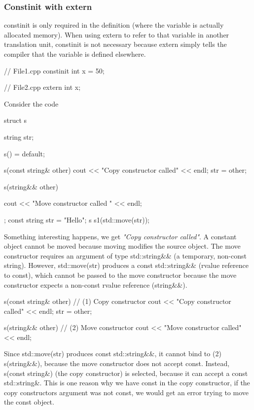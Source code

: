 \documentclass{report}
\begin{document}
    \bigbreak \noindent 
    \subsubsection{Constinit with extern}
    \bigbreak \noindent 
    constinit is only required in the definition (where the variable is actually allocated memory).
    \bigbreak \noindent 
    When using extern to refer to that variable in another translation unit, constinit is not necessary because extern simply tells the compiler that the variable is defined elsewhere.

    \bigbreak \noindent 
    \begin{cppcode}
    // File1.cpp
    constinit int x = 50;

    // File2.cpp
    extern int x;
    \end{cppcode}

    \pagebreak 
    \bigbreak \noindent 
    Consider the code
    \bigbreak \noindent 
    \begin{cppcode}
        struct s {
            string str{};

            s() = default;

            s(const string& other) {
                cout << "Copy constructor called" << endl;
                str = other;
            }

            s(string&& other) {
                cout << "Move constructor called " << endl;

            }
        };
        const string str = "Hello";
        s s1(std::move(str));
    \end{cppcode}
    \bigbreak \noindent 
    Something interesting happens, we get \textit{"Copy constructor called"}. A constant object cannot be moved because moving modifies the source object.
    \bigbreak \noindent 
    The move constructor requires an argument of type std::string\&\& (a temporary, non-const string).
    \bigbreak \noindent 
    However, std::move(str) produces a const std::string\&\& (rvalue reference to const), which cannot be passed to the move constructor because the move constructor expects a non-const rvalue reference (string\&\&).
    \bigbreak \noindent 
    \begin{cppcode}
        s(const string& other) {   // (1) Copy constructor
            cout << "Copy constructor called" << endl;
            str = other;
        }

        s(string&& other) {        // (2) Move constructor
            cout << "Move constructor called" << endl;
        }
    \end{cppcode}
    \bigbreak \noindent 
    Since std::move(str) produces const std::string\&\&, it cannot bind to (2) s(string\&\&), because the move constructor does not accept const.
    \bigbreak \noindent 
    Instead, s(const string\&) (the copy constructor) is selected, because it can accept a const std::string\&.
    \bigbreak \noindent 
    This is one reason why we have const in the copy constructor, if the copy constructors argument was not const, we would get an error trying to move the const object.
\end{document}
